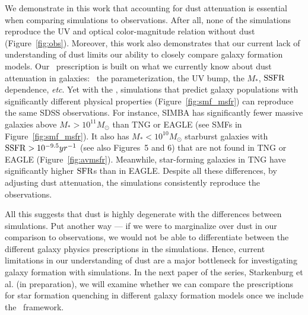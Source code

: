 We demonstrate in this work that accounting for dust attenuation is
essential when comparing simulations to observations. 
After all, none of the simulations reproduce the UV and optical
color-magnitude relation without dust (Figure~\ref{fig:obs}). 
Moreover, this work also demonstrates that our current lack of 
understanding of dust limits our ability to closely compare galaxy
formation models. 
Our \eda~prescription is built on what we currently know about dust attenuation
in galaxies: \eg~the \citealt{noll2009} parameterization, the UV bump, the
$M_*$, ${\rm SSFR}$ dependence, \emph{etc}.
Yet with the \eda, simulations that predict galaxy populations with
significantly different physical properties (Figure~\ref{fig:smf_msfr}) can
reproduce the same SDSS observations. 
For instance, SIMBA has significantly fewer massive galaxies above $M_* >
10^{11}M_\odot$ than TNG or EAGLE (see SMFs in Figure~\ref{fig:smf_msfr}). 
It also has $M_* < 10^{10}M_\odot$ starburst galaxies with ${\rm SSFR} >
10^{-9.5}yr^{-1}$ (see also \citealt{dave2019} Figures~5 and 6)
that are not found in TNG or EAGLE (Figure~\ref{fig:avmsfr}). 
Meanwhile, star-forming galaxies in TNG have significantly higher ${\rm SFR}$s than
in EAGLE.
Despite all these differences, by adjusting dust attenuation, the simulations
consistently reproduce the observations.

All this suggests that dust is highly degenerate with the differences between simulations. 
Put another way --- if we were to marginalize over dust in our comparison to
observations, we would not be able to differentiate between the different
galaxy physics prescriptions in the simulations. 
Hence, current limitations in our understanding of dust are a major bottleneck
for investigating galaxy formation with simulations.
In the next paper of the series, Starkenburg et al. (in preparation), we
will examine whether we can compare the prescriptions for star formation
quenching in different galaxy formation models once we include the
\eda~framework.



